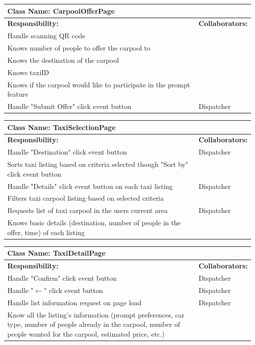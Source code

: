 \documentclass[]{article}
\begin{document}
	\begin{table}[H]
	\centering
	\begin{tabular}{|p{6cm}|p{6cm}|}
	\hline 
		\multicolumn{2}{|l|}{\textbf{Class Name: CarpoolOfferPage}} \\
	\hline
	\textbf{Responsibility:} & \textbf{Collaborators:} \\
	\hline
	Handle scanning QR code &  \\ \hline
	Knows number of people to offer the carpool to &\\ \hline
	Knows the destination of the carpool &\\ \hline
	Knows taxiID &\\ \hline
	Knows if the carpool would like to participate in the prompt feature & \\ \hline
	Handle "Submit Offer" click event button & Dispatcher\\ \hline
	\end{tabular}
	\end{table}
	
	\begin{table}[H]
	\centering
	\begin{tabular}{|p{6cm}|p{6cm}|}
	\hline 
		\multicolumn{2}{|l|}{\textbf{Class Name: TaxiSelectionPage}} \\
	\hline
	\textbf{Responsibility:} & \textbf{Collaborators:} \\
	\hline
	Handle "Destination" click event button & Dispatcher \\ \hline
	Sorts taxi listing based on criteria selected though "Sort by" click event button & \\ \hline
	Handle "Details" click event button on each taxi listing & Dispatcher \\ \hline
	Filters taxi carpool listing based on selected criteria & \\ \hline
	Requests list of taxi carpool in the users current area & Dispatcher \\ \hline
	Knows basic details (destination, number of people in the offer, time) of each listing & \\ \hline
	\end{tabular}
	\end{table}
	
	\begin{table}[H]
	\centering
	\begin{tabular}{|p{6cm}|p{6cm}|}
	\hline 
		\multicolumn{2}{|l|}{\textbf{Class Name: TaxiDetailPage}} \\
	\hline
	\textbf{Responsibility:} & \textbf{Collaborators:} \\
	\hline
	Handle "Confirm" click event button & Dispatcher \\ \hline
	Handle "$\xleftarrow{}$" click event button & Dispatcher \\ \hline
	Handle list information request on page load & Dispatcher\\ \hline
	Know all the listing's information (prompt preferences, car type, number of people already in the carpool, number of people wanted for the carpool, estimated price, etc.)  & \\ \hline
	\end{tabular}
	\end{table}
	
\end{document}
